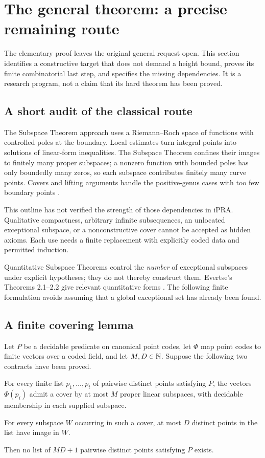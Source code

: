 \section{The general theorem: a precise remaining route}
\label{sec:general-route}

The elementary proof leaves the original general request open. This section
identifies a constructive target that does not demand a height bound, proves
its finite combinatorial last step, and specifies the missing dependencies.
It is a research program, not a claim that its hard theorem has been proved.

\subsection{A short audit of the classical route}

The Subspace Theorem approach uses a Riemann--Roch space of functions with
controlled poles at the boundary. Local estimates turn integral points
into solutions of linear-form inequalities. The Subspace Theorem confines
their images to finitely many proper subspaces; a nonzero function with
bounded poles has only boundedly many zeros, so each subspace contributes
finitely many curve points. Covers and lifting arguments handle the
positive-genus cases with too few boundary points
\cite{CorvajaZannier2002}.

This outline has not verified the strength of those dependencies in iPRA.
Qualitative compactness, arbitrary infinite subsequences, an unlocated
exceptional subspace, or a nonconstructive cover cannot be accepted as
hidden axioms. Each use needs a finite replacement with explicitly coded
data and permitted induction.

Quantitative Subspace Theorems control the \emph{number} of exceptional
subspaces under explicit hypotheses; they do not thereby construct them.
Evertse's Theorems 2.1--2.2 give relevant quantitative forms
\cite{Evertse2010}. The following finite formulation avoids assuming that
a global exceptional set has already been found.

\subsection{A finite covering lemma}

\begin{proposition}
Let $P$ be a decidable predicate on canonical point codes, let $\Phi$ map
point codes to finite vectors over a coded field, and let $M,D\in\mathbb N$.
Suppose the following two contracts have been proved.

For every finite list $p_1,\ldots,p_t$ of pairwise distinct points satisfying
$P$, the vectors $\Phi(p_i)$ admit a cover by at most $M$ proper linear
subspaces, with decidable membership in each supplied subspace.

For every subspace $W$ occurring in such a cover, at most $D$ distinct
points in the list have image in $W$.

Then no list of $MD+1$ pairwise distinct points satisfying $P$ exists.
\end{proposition}

